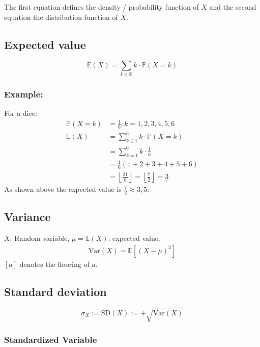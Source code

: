 \documentclass[twoside, a4paper, twocolumn]{article}
\begin{document}
    The first equation defines the density / probability function of $X$ and the
    second equation the distribution function of $X$.

    \subsection{Expected value}
    \begin{equation}
        \mathbb{E}(X) = \sum_{k \in \mathbb{R}}k \cdot \mathbb{P}(X = k)
    \end{equation}

    \subsubsection{Example:}
    For a dice:
    \begin{align*}
        \mathbb{P}(X = k) &= \frac{1}{6}; k = 1,2,3,4,5,6 \\
        \mathbb{E}(X) &= \sum_{k \in 1}^6 k \cdot \mathbb{P}(X = k) \\
                      &= \sum_{k = 1}^6 k \cdot \frac{1}{6} \\
                      &= \frac{1}{6} (1+2+3+4+5+6) \\
                      &= \left\lfloor\frac{21}{6}\right\rfloor =
                      \left\lfloor\frac{7}{2}\right\rfloor = \underline{\underline{3}}
    \end{align*}
    As shown above the expected value is $\frac{7}{2} \approx 3,5$.

    \subsection{Variance}
    $X$: Random variable, $\mu = \mathbb{E}(X)$: expected value.
    \begin{eqnarray}
    \textrm{Var}(X) = \mathbb{E}\left[(X - \mu)^2\right]
    \end{eqnarray}
    $\left[a\right]$ denotes the flooring of $a$.

    \subsection{Standard deviation}

    \begin{equation}
        \sigma_X := \textrm{SD}(X) := +\sqrt{\textrm{Var}(X)}
    \end{equation}

    \subsubsection{Standardized Variable}
\end{document}
